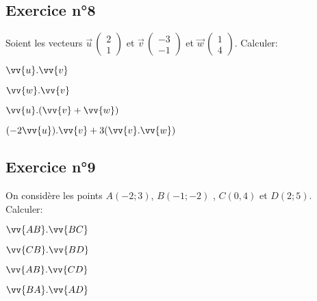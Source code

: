 \documentclass[12pt,a4paper]{article}
\newcommand*{\Coord}[3]{%
  \ensuremath{\overrightarrow{#1}\, 
    \begin{pmatrix} 
      #2\\ 
      #3 
    \end{pmatrix}}}
\begin{document}
\subsection*{Exercice n°8}

Soient les vecteurs $\Coord{u}{2}{1}$ et 
$\Coord{v}{-3}{-1}$ et $\Coord{w}{1}{4}$. Calculer:

\begin{enumerate}
\begin{minipage}[t]{0.3\linewidth}
\item $\vv{u}.\vv{v}$

\end{minipage}
\begin{minipage}[t]{0.3\linewidth}
\item $\vv{w}.\vv{v}$

\end{minipage}
\begin{minipage}[t]{0.3\linewidth}
\item $\vv{u}.(\vv{v}+\vv{w})$
\end{minipage}

\begin{minipage}[t]{0.3\linewidth}
\item $(-2\vv{u}).\vv{v}+3(\vv{v}.\vv{w})$
\end{minipage}

\end{enumerate}


\subsection*{Exercice n°9}

On considère les points $A(-2;3)$, $B(-1;-2)$ , $C(0,4)$ et $D(2;5)$. Calculer:

\begin{enumerate}
\begin{minipage}[t]{0.2\linewidth}
\item $\vv{AB}.\vv{BC}$

\end{minipage}
\begin{minipage}[t]{0.2\linewidth}
\item $\vv{CB}.\vv{BD}$

\end{minipage}
\begin{minipage}[t]{0.2\linewidth}
\item $\vv{AB}.\vv{CD}$
\end{minipage}

\begin{minipage}[t]{0.2\linewidth}
\item $\vv{BA}.\vv{AD}$
\end{minipage}

\end{enumerate}
\end{document}
